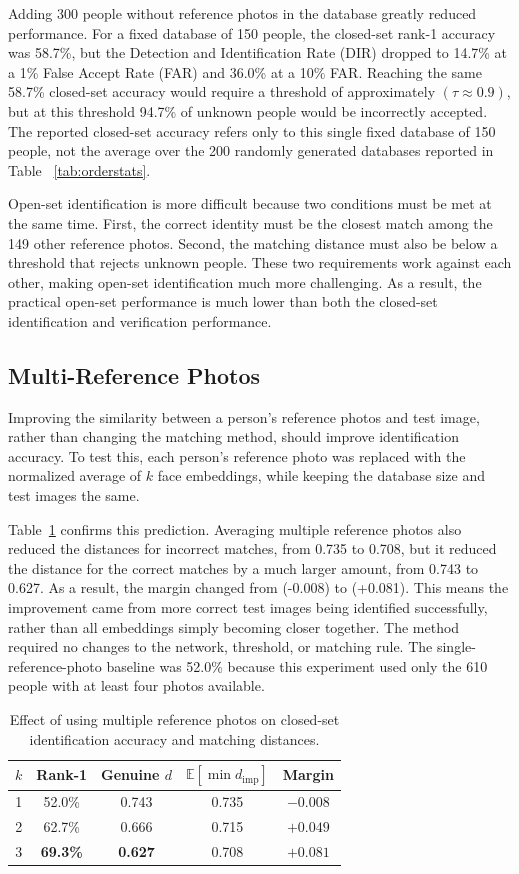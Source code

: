 \documentclass[conference]{IEEEtran}
\begin{document}
Adding 300 people without reference photos in the database greatly reduced performance. For a fixed database of 150 people, the closed-set rank-1 accuracy was 58.7\%, but the Detection and Identification Rate (DIR) dropped to 14.7\% at a 1\% False Accept Rate (FAR) and 36.0\% at a 10\% FAR. Reaching the same 58.7\% closed-set accuracy would require a threshold of approximately $(\tau \approx 0.9)$, but at this threshold 94.7\% of unknown people would be incorrectly accepted. The reported closed-set accuracy refers only to this single fixed database of 150 people, not the average over the 200 randomly generated databases reported in Table ~\ref{tab:orderstats}.

Open-set identification is more difficult because two conditions must be met at the same time. First, the correct identity must be the closest match among the 149 other reference photos. Second, the matching distance must also be below a threshold that rejects unknown people. These two requirements work against each other, making open-set identification much more challenging. As a result, the practical open-set performance is much lower than both the closed-set identification and verification performance.

\subsection{Multi-Reference Photos}
\label{sec:multishot}
Improving the similarity between a person's reference photos and test image, rather than changing the matching method, should improve identification accuracy. To test this, each person's reference photo was replaced with the normalized average of \(k\) face embeddings, while keeping the database size and test images the same.

Table~\ref{tab:multishot} confirms this prediction. Averaging multiple reference photos also reduced the distances for incorrect matches, from 0.735 to 0.708, but it reduced the distance for the correct matches by a much larger amount, from 0.743 to 0.627. As a result, the margin changed from (-0.008) to (+0.081). This means the improvement came from more correct test images being identified successfully, rather than all embeddings simply becoming closer together. The method required no changes to the network, threshold, or matching rule. The single-reference-photo baseline was 52.0\% because this experiment used only the 610 people with at least four photos available.


\begin{table}[!t]
\caption{Effect of using multiple reference photos on closed-set identification accuracy and matching distances.}
\label{tab:multishot}
\centering
\begin{tabular}{ccccc}
\toprule
$k$ & Rank-1 & Genuine $d$ & $\mathbb{E}[\min d_{\text{imp}}]$ & Margin \\
\midrule
1 & 52.0\% & 0.743 & 0.735 & $-0.008$ \\
2 & 62.7\% & 0.666 & 0.715 & $+0.049$ \\
3 & \textbf{69.3\%} & \textbf{0.627} & 0.708 & $\mathbf{+0.081}$ \\
\bottomrule
\end{tabular}
\end{table}
\end{document}
